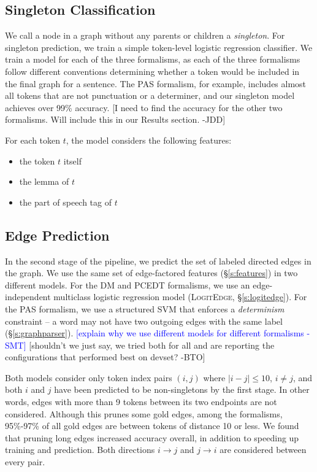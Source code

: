 \documentclass[11pt]{article}
\newcommand{\bocomment}[1]{\textcolor{Bittersweet}{[#1 -BTO]}}
\newcommand{\sam}[1]{\textcolor{blue}{[#1 -SMT]}}
\newcommand{\jdcomment}[1]{\textcolor{NavyBlue}{[#1 -JDD]}}
\newcommand{\logitedge}{\textsc{LogitEdge}}
\begin{document}
\subsection{Singleton Classification} \label{s:singleton_model}

We call a node in a graph without any parents or children a \emph{singleton}.
For singleton prediction, we train a simple token-level logistic regression
classifier.
We train a model for each of the three formalisms, as each of the three
formalisms follow different conventions determining whether a token would be
included in the final graph for a sentence.
The PAS formalism, for example, includes almost all tokens that are not
punctuation or a determiner, and our singleton model achieves over 99\%
accuracy.
\jdcomment{I need to find the accuracy for the other two formalisms. Will
include this in our Results section.}

For each token $t$, the model considers the following features:
\begin{itemize}
\item the token $t$ itself
\item the lemma of $t$
\item the part of speech tag of $t$
\end{itemize}



\subsection{Edge Prediction} \label{s:edge_model}

In the second stage of the pipeline, we predict the set of labeled directed
edges in the graph.
We use the same set of edge-factored features (\S\ref{s:features}) in two
different models.
For the DM and PCEDT formalisms, we use an edge-independent multiclass logistic
regression model (\logitedge, \S\ref{s:logitedge}).
For the PAS formalism, we use a structured SVM 
\cite{taskar_max_2003,tsochantaridis_support_2004} that enforces a
\emph{determinism} constraint -- a word may not have two outgoing edges with the
same label (\S\ref{s:graphparser}).
\sam{explain why we use different models for different formalisms}
\bocomment{shouldn't we just say, we tried both for all and are reporting the configurations that performed best on devset?}

Both models consider only token index pairs $(i, j)$ where %
$|i-j| \leq 10$, $i \ne j$, and both $i$ and
$j$ have been predicted to be non-singletons by the first stage.
In other words, edges with more than 9 tokens between its two endpoints are not
considered.
Although this prunes some gold edges, among the formalisms,
95\%-97\% of all gold edges are between tokens of distance 10 or less.
We found that pruning long edges increased accuracy overall, in addition to
speeding up training and prediction.
Both directions $i \rightarrow j$ and $j \rightarrow
i$ are considered between every pair.
\end{document}

